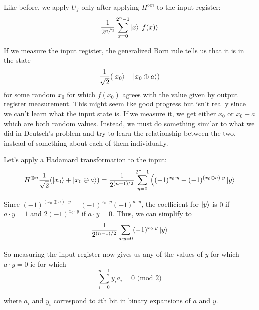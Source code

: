 \documentclass[letterpaper]{article}
\begin{document}
Like before, we apply $U_{f}$ only after applying $H^{\otimes n}$ to the input register: 
$$\frac{1}{2^{n/2}} \sum_{x = 0}^{2^{n} - 1} \ket{x} \ket{f(x)} $$

If we measure the input register, the generalized Born rule tells us that it is in the state 
$$ \frac{1}{\sqrt{2}} (\ket{x_{0}} + \ket{x_{0} \oplus a}) $$ for some random $x_{0}$ for which $f(x_{0})$ agrees with the value given by output register measurement. This might seem like good progress but isn't really since we can't learn what the input state is. If we measure it, we get either $x_{0}$ or $x_{0} + a$ which are both random values. Instead, we must do something similar to what we did in Deutsch's problem and try to learn the relationship between the two, instead of something about each of them individually. 

Let's apply a Hadamard transformation to the input:
$$ H^{\otimes n} \frac{1}{\sqrt{2}} (\ket{x_{0}} + \ket{x_{0} \oplus a}) = \frac{1}{2^{(n+1) / 2}} \sum_{y = 0}^{2^{n} - 1} \Big( (-1)^{x_{0} \cdot y} + (-1)^{(x_{0} \oplus a) \cdot y} \ket{y} $$

Since $(-1)^{(x_{0} \oplus a) \cdot y} = (-1)^{x_{0} \cdot y} (-1)^{a \cdot y}$, the coefficient for $\ket{y}$ is $0$ if $a \cdot y = 1$ and $2 (-1)^{x_{0} \cdot y}$ if $a \cdot y = 0$. Thus, we can simplify to
$$ \frac{1}{2^{(n-1)/2}} \sum_{a \cdot y = 0} (-1)^{x_{0} \cdot y} \ket{y} $$

So measuring the input register now gives us any of the values of $y$ for which $a \cdot y = 0$ ie for which 
$$\sum_{i = 0}^{n - 1} y_{i} a_{i}= 0 \text{ (mod 2)} $$

where $a_{i}$ and $y_{i}$ correspond to $i$th bit in binary expansions of $a$ and $y$. 
\end{document}
